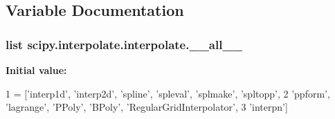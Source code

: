 \subsection{Variable Documentation}
\hypertarget{namespacescipy_1_1interpolate_1_1interpolate_a94c701f1e486488916eaeabb6dc5fe72}{}
\subsubsection[{\+\_\+\+\_\+all\+\_\+\+\_\+}]{\setlength{\rightskip}{0pt plus 5cm}list scipy.\+interpolate.\+interpolate.\+\_\+\+\_\+all\+\_\+\+\_\+}\label{namespacescipy_1_1interpolate_1_1interpolate_a94c701f1e486488916eaeabb6dc5fe72}
{\bfseries Initial value\+:}
\begin{DoxyCode}
1 = [\textcolor{stringliteral}{'interp1d'}, \textcolor{stringliteral}{'interp2d'}, \textcolor{stringliteral}{'spline'}, \textcolor{stringliteral}{'spleval'}, \textcolor{stringliteral}{'splmake'}, \textcolor{stringliteral}{'spltopp'},
2            \textcolor{stringliteral}{'ppform'}, \textcolor{stringliteral}{'lagrange'}, \textcolor{stringliteral}{'PPoly'}, \textcolor{stringliteral}{'BPoly'}, \textcolor{stringliteral}{'RegularGridInterpolator'},
3            \textcolor{stringliteral}{'interpn'}]
\end{DoxyCode}

